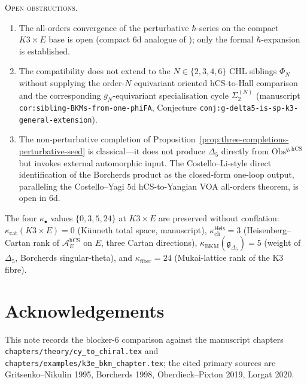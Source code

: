 \documentclass[11pt]{amsart}
\providecommand{\cA}{\mathcal{A}}
\providecommand{\Obs}{\mathrm{Obs}}
\providecommand{\hCS}{\mathrm{hCS}}
\providecommand{\Heis}{\mathsf{Heis}}
\providecommand{\Gdelta}{\mathfrak{g}_{\Delta_{5}}}
\providecommand{\kch}{\kappa_{\mathrm{ch}}}
\providecommand{\kcat}{\kappa_{\mathrm{cat}}}
\providecommand{\kBKM}{\kappa_{\mathrm{BKM}}}
\providecommand{\kfib}{\kappa_{\mathrm{fiber}}}
\theoremstyle{plain}
\theoremstyle{definition}
\theoremstyle{remark}
\begin{document}
\textsc{Open obstructions.}
\begin{enumerate}
\item[(O1)] The all-orders convergence of the perturbative
$\hbar$-series on the compact $K3\times E$ base is open (compact $6$d
analogue of \cite{CostelloYagi2018}); only the formal
$\hbar$-expansion is established.
\item[(O2)] The compatibility does not extend to the
$N\in\{2,3,4,6\}$ CHL siblings $\Phi_{N}$ without supplying the
order-$N$ equivariant oriented hCS-to-Hall comparison and the
corresponding $g_{N}$-equivariant specialisation cycle
$\Sigma_{2}^{(N)}$ (manuscript
\texttt{cor:sibling-BKMs-from-one-phiFA}, Conjecture
\texttt{conj:g-delta5-is-sp-k3-general-extension}).
\item[(O3)] The non-perturbative completion of
Proposition~\ref{prop:three-completions-perturbative-seed} is
classical---it does not produce $\Delta_{5}$ directly from
$\Obs^{q,\hCS}$ but invokes external automorphic input. The
Costello--Li-style direct identification of the Borcherds product as
the closed-form one-loop output, paralleling the Costello--Yagi $5$d
hCS-to-Yangian VOA all-orders theorem, is open in $6$d.
\end{enumerate}

The four $\kappa_{\bullet}$ values $\{0,3,5,24\}$ at $K3\times E$ are
preserved without conflation: $\kcat(K3\times E)=0$ (K\"unneth total
space, manuscript), $\kch^{\Heis}=3$ (Heisenberg--Cartan rank of
$\cA_{E}^{\hCS}$ on $E$, three Cartan directions), $\kBKM(\Gdelta)=5$
(weight of $\Delta_{5}$, Borcherds singular-theta), and $\kfib=24$
(Mukai-lattice rank of the K3 fibre).

\section*{Acknowledgements}

This note records the blocker-6 comparison against the manuscript
chapters \texttt{chapters/\allowbreak theory/\allowbreak cy\_\allowbreak to\_\allowbreak chiral.tex} and
\texttt{chapters/\allowbreak examples/\allowbreak k3e\_\allowbreak bkm\_\allowbreak chapter.tex}; the cited primary
sources are Gritsenko--Nikulin 1995, Borcherds 1998,
Oberdieck--Pixton 2019, Lorgat 2020.
\end{document}
